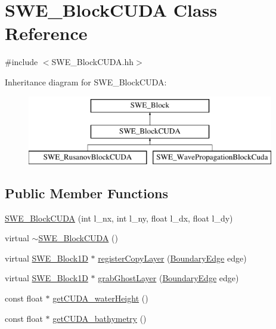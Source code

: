 \hypertarget{classSWE__BlockCUDA}{\section{S\-W\-E\-\_\-\-Block\-C\-U\-D\-A Class Reference}
\label{classSWE__BlockCUDA}
}


{\ttfamily \#include $<$S\-W\-E\-\_\-\-Block\-C\-U\-D\-A.\-hh$>$}

Inheritance diagram for S\-W\-E\-\_\-\-Block\-C\-U\-D\-A\-:\begin{figure}[H]
\begin{center}
\leavevmode
\includegraphics[height=3.000000cm]{classSWE__BlockCUDA}
\end{center}
\end{figure}
\subsection*{Public Member Functions}
\begin{DoxyCompactItemize}
\item 
\hyperlink{classSWE__BlockCUDA_a7e4f5f08cf6179d17e7ff64cb2f182d8}{S\-W\-E\-\_\-\-Block\-C\-U\-D\-A} (int l\-\_\-nx, int l\-\_\-ny, float l\-\_\-dx, float l\-\_\-dy)
\item 
virtual \hyperlink{classSWE__BlockCUDA_a37517831b7f36a9405eb566bc86e4243}{$\sim$\-S\-W\-E\-\_\-\-Block\-C\-U\-D\-A} ()
\item 
virtual \hyperlink{structSWE__Block1D}{S\-W\-E\-\_\-\-Block1\-D} $\ast$ \hyperlink{classSWE__BlockCUDA_a22782766fc679ac14e9ba30a4efc1688}{register\-Copy\-Layer} (\hyperlink{SWE__Scenario_8hh_aa5e01e3f7df312f7b9b0d02521141fcc}{Boundary\-Edge} edge)
\item 
virtual \hyperlink{structSWE__Block1D}{S\-W\-E\-\_\-\-Block1\-D} $\ast$ \hyperlink{classSWE__BlockCUDA_ab8671269d89d544a333a0b8c0fa72f37}{grab\-Ghost\-Layer} (\hyperlink{SWE__Scenario_8hh_aa5e01e3f7df312f7b9b0d02521141fcc}{Boundary\-Edge} edge)
\item 
const float $\ast$ \hyperlink{classSWE__BlockCUDA_a6d1b455840114ed08d785e17741e3015}{get\-C\-U\-D\-A\-\_\-water\-Height} ()
\item 
const float $\ast$ \hyperlink{classSWE__BlockCUDA_ad8bf853a1319ed215010dc05c78d33e6}{get\-C\-U\-D\-A\-\_\-bathymetry} ()
\end{DoxyCompactItemize}
